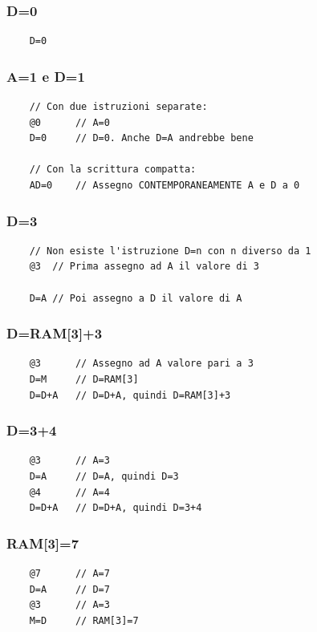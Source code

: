 \documentclass[12pt]{article}
\begin{document}
\subsubsection{D=0}
\begin{lstlisting}
    D=0
\end{lstlisting}

\subsubsection{A=1 e D=1}
\begin{lstlisting}
    // Con due istruzioni separate:
    @0      // A=0
    D=0     // D=0. Anche D=A andrebbe bene

    // Con la scrittura compatta:
    AD=0    // Assegno CONTEMPORANEAMENTE A e D a 0
\end{lstlisting}

\subsubsection{D=3}
\begin{lstlisting}
    // Non esiste l'istruzione D=n con n diverso da 1
    @3  // Prima assegno ad A il valore di 3

    D=A // Poi assegno a D il valore di A
\end{lstlisting}

\subsubsection{D=RAM[3]+3}
\begin{lstlisting}
    @3      // Assegno ad A valore pari a 3
    D=M     // D=RAM[3]
    D=D+A   // D=D+A, quindi D=RAM[3]+3
\end{lstlisting}

\subsubsection{D=3+4}
\begin{lstlisting}
    @3      // A=3
    D=A     // D=A, quindi D=3
    @4      // A=4
    D=D+A   // D=D+A, quindi D=3+4
\end{lstlisting}

\subsubsection{RAM[3]=7}
\begin{lstlisting}
    @7      // A=7
    D=A     // D=7
    @3      // A=3
    M=D     // RAM[3]=7
\end{lstlisting}
\end{document}

